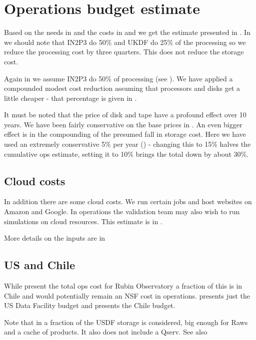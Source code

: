 \section{Operations budget estimate}\label{sec:opscost}
Based on the needs in  and the costs in  and 
we get the estimate presented in .
In  we should note that IN2P3 do 50\%  and UKDF do 25\% of the processing so we reduce the processing cost by three quarters.
This does not reduce the storage cost.



Again in  we assume IN2P3 do 50\% of processing (see ).
We have applied a compounded modest cost reduction assuming that processors  and disks get a little cheaper - that
percentage is given in .

It must be noted that the price of disk and tape have a profound effect over 10 years. We have been fairly conservative on the base prices
in . An even bigger effect is in the compounding of the presumed fall in storage cost. Here we have used an extremely
conservative 5\% per year () - changing this to 15\% halves the cumulative ops estimate, setting it to 10\% brings the
total down by about 30\%.

\subsection{Cloud costs}
In addition there are some cloud costs. We run certain jobs and host websites on Amazon and Google. In operations
the validation team may also wish to run simulations on cloud resources. This estimate is in .




More details on the inputs are in 

\subsection{US and Chile}
While  present the total ops cost for Rubin Observatory a fraction of this is in Chile and would potentially remain an NSF cost in operations.  presents just the US Data Facility budget  and
 presents the Chile budget.



Note that in  a fraction of the USDF storage is considered, big enough for Raws and a cache of products. It also does not include a Qserv. See also 

